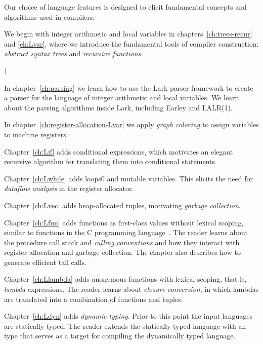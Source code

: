 \documentclass[7x10]{TimesAPriori_MIT}%
\def\racketEd{0}
\def\pythonEd{1}
\def\edition{1}
\newcommand{\racket}[1]{{\if\edition\racketEd{#1}\fi}}
\newcommand{\pythonColor}[0]{}
\numberwithin{theorem}{chapter}
\numberwithin{definition}{chapter}
\numberwithin{equation}{chapter}
\begin{document}
Our choice of language features is designed to elicit fundamental
concepts and algorithms used in compilers.
\begin{itemize}
\item We begin with integer arithmetic and local variables in
  chapters~\ref{ch:trees-recur} and \ref{ch:Lvar}, where we introduce
  the fundamental tools of compiler construction: \emph{abstract
    syntax trees} and \emph{recursive functions}. 
{\if\edition\pythonEd\pythonColor
\item In chapter~\ref{ch:parsing} we learn how to use the Lark
  parser framework to create a parser for the language of integer
  arithmetic and local variables. We learn about the parsing
  algorithms inside Lark, including Earley and LALR(1).
%
\fi}
\item In chapter~\ref{ch:register-allocation-Lvar} we apply
  \emph{graph coloring} to assign variables to machine registers.
\item Chapter~\ref{ch:Lif} adds conditional expressions, which
  motivates an elegant recursive algorithm for translating them into
  conditional  statements.
\item Chapter~\ref{ch:Lwhile} adds loops\racket{ and mutable
  variables}. This elicits the need for \emph{dataflow
    analysis} in the register allocator.
\item Chapter~\ref{ch:Lvec} adds heap-allocated tuples, motivating
  \emph{garbage collection}.
\item Chapter~\ref{ch:Lfun} adds functions as first-class values 
  without lexical scoping, similar to functions in the C programming
  language~\citep{Kernighan:1988nx}. The reader learns about the
  procedure call stack and \emph{calling conventions} and how they interact
  with register allocation and garbage collection. The chapter also
  describes how to generate efficient tail calls.
\item Chapter~\ref{ch:Llambda} adds anonymous functions with lexical
  scoping, that is, \emph{lambda} expressions. The reader learns about
  \emph{closure conversion}, in which lambdas are translated into a
  combination of functions and tuples.
\item Chapter~\ref{ch:Ldyn} adds \emph{dynamic typing}. Prior to this
  point the input languages are statically typed.  The reader extends
  the statically typed language with an  type that serves
  as a target for compiling the dynamically typed language.

\end{itemize}
\end{document}
